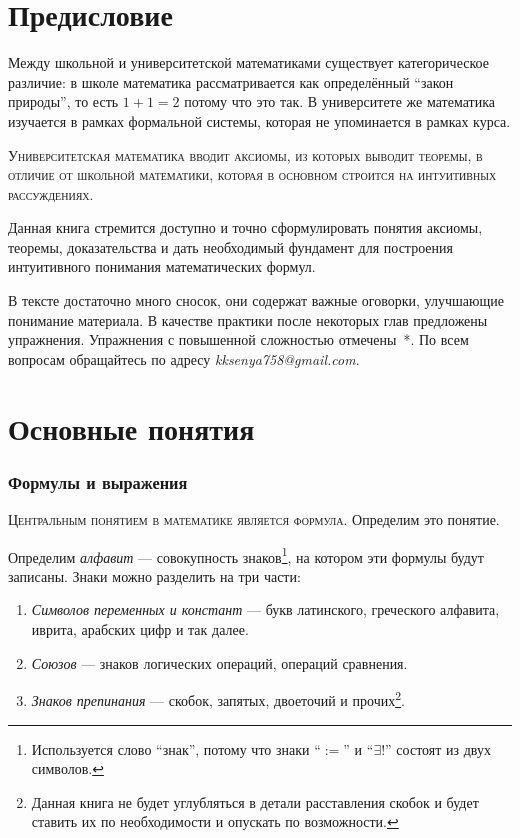 \part{Предисловие}

Между школьной и университетской математиками существует категорическое
различие: в школе математика рассматривается как определённый ``закон природы'',
то есть $1+1=2$ потому что это так. В университете же математика изучается
в рамках формальной системы, которая не упоминается в рамках курса.

\textsc{Университетская математика вводит аксиомы, из которых выводит теоремы,
	в отличие от школьной математики, которая
	в основном строится на интуитивных рассуждениях.}

Данная книга стремится доступно и точно сформулировать понятия аксиомы,
теоремы, доказательства и дать необходимый фундамент для построения
интуитивного понимания математических формул.

В тексте достаточно много сносок, они содержат важные оговорки,
улучшающие понимание материала. В качестве практики
после некоторых глав предложены упражнения. Упражнения с повышенной сложностью
отмечены~*.
По всем вопросам обращайтесь по адресу {\sl kksenya758@gmail.com}.

\part{Основные понятия}

\section{Формулы и выражения}

\textsc{Центральным понятием в математике является формула.}
Определим это понятие.

Определим {\it алфавит} --- совокупность знаков\footnote{
	Используется слово ``знак'', потому что знаки ``$:=$'' и ``$\exists!$''
	состоят из двух символов.
}, на котором эти
формулы будут записаны. Знаки можно разделить на три части:
\begin{enumerate}
	\item{}{\it Символов переменных и констант} --- букв латинского, греческого алфавита,
	иврита, арабских цифр и так далее.
	\item{}{\it Союзов} --- знаков логических операций, операций сравнения.
	\item{}{\it Знаков препинания} --- скобок, запятых, двоеточий и прочих\footnote{
		Данная книга не будет углубляться в детали расставления скобок и будет ставить
		их по необходимости и опускать по возможности.
	}.
\end{enumerate}

